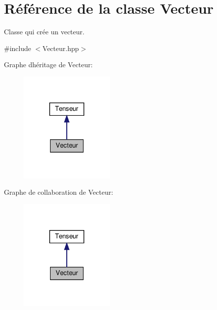 \hypertarget{classVecteur}{}\section{Référence de la classe Vecteur}
\label{classVecteur}


Classe qui crée un vecteur.  




{\ttfamily \#include $<$Vecteur.\+hpp$>$}



Graphe d\textquotesingle{}héritage de Vecteur\+:
\nopagebreak
\begin{figure}[H]
\begin{center}
\leavevmode
\includegraphics[width=132pt]{classVecteur__inherit__graph}
\end{center}
\end{figure}


Graphe de collaboration de Vecteur\+:
\nopagebreak
\begin{figure}[H]
\begin{center}
\leavevmode
\includegraphics[width=132pt]{classVecteur__coll__graph}
\end{center}
\end{figure}
